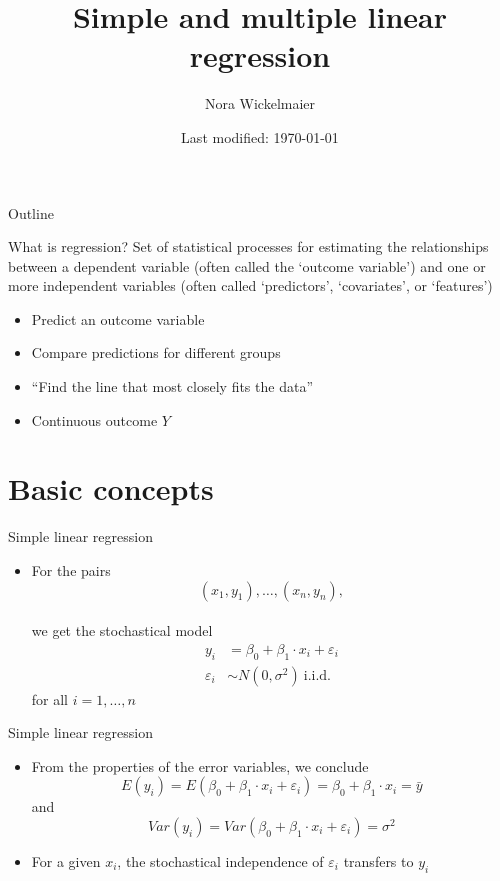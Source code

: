 \documentclass[aspectratio=169]{beamer}
\title{Simple and multiple linear regression}
\author{Nora Wickelmaier}
\date{Last modified: \today}
\begin{document}
\begin{frame}{}
\thispagestyle{empty}
\titlepage
\end{frame}

\begin{frame}{Outline}
\tableofcontents
\end{frame}


\begin{frame}{What is regression?}
  \pause
  Set of statistical processes for estimating the relationships between a
  dependent variable (often called the `outcome variable') and one or more
  independent variables (often called `predictors', `covariates', or
  `features')
  \pause
\vfill
  \begin{itemize}
    \item Predict an outcome variable
    \item Compare predictions for different groups
    \item ``Find the line that most closely fits the data''
    \item Continuous outcome $Y$
  \end{itemize}
\end{frame}

\section{Basic concepts}

\begin{frame}{Simple linear regression}
  \begin{itemize}
    \item For the pairs
      \[
        (x_1, y_1), \ldots, (x_n, y_n),
      \]\\[2ex]
    we get the stochastical model
      \begin{align*}
        y_i & = \beta_0 + \beta_1 \cdot x_i + \varepsilon_i\\
        \varepsilon_i & \sim N(0, \sigma^2)~\text{i.i.d.}
      \end{align*}
for all $i = 1, \dots, n$
  \end{itemize}
\end{frame}

\begin{frame}{Simple linear regression}
  \begin{itemize}
    \item From the properties of the error variables, we conclude
\[
  E(y_i) = E(\beta_0 + \beta_1 \cdot x_i + \varepsilon_i) =
  \beta_0 + \beta_1 \cdot x_i = \bar{y}
\]
and
\[
  Var(y_i) = Var(\beta_0 + \beta_1 \cdot x_i + \varepsilon_i) = \sigma^2
\]
\item For a given $x_i$, the stochastical independence of $\varepsilon_i$
  transfers to $y_i$\\[2ex]
  \end{itemize}
\end{frame}
\end{document}
